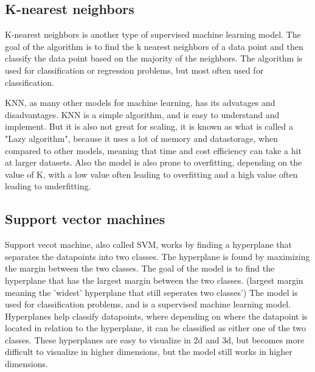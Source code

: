
\subsection{K-nearest neighbors}
K-nearest neighbors is another type of supervised machine learning model. The goal of the algorithm is to find the k nearest neighbors of a data point and then classify the data point based on the majority of the neighbors. The algorithm is used for classification or regression problems, but most often used for classification.  

KNN, as many other models for machine learning, has its advatages and disadvantages. KNN is a simple algorithm, and is easy to understand and implement. But it is also not great for scaling, it is known as what is called a "Lazy algorithm", because it uses a lot of memory and datastorage, when compared to other models, meaning that time and cost efficiency can take a hit at larger datasets. Also the model is also prone to overfitting, depending on the value of K, with a low value often leading to overfitting and a high value often leading to underfitting.

\subsection{Support vector machines}
Support vecot machine, also called SVM, works by finding a hyperplane that separates the datapoints into two classes. The hyperplane is found by maximizing the margin between the two classes. The goal of the model is to find the hyperplane that has the largest margin between the two classes. (largest margin meaning the 'widest' hyperplane that still seperates two classes') The model is used for classification problems, and is a supervised machine learning model. Hyperplanes help classify datapoints, where depending on where the datapoint is located in relation to the hyperplane, it can be classified as either one of the two classes. These hyperplanes are easy to visualize in 2d and 3d, but becomes more difficult to visualize in higher dimensions, but the model still works in higher dimensions.

